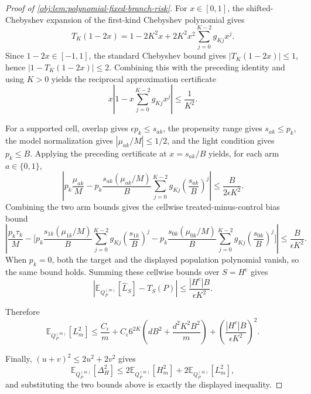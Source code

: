 \begin{proof}[Proof of \cref{obj:lem:polynomial-fixed-branch-risk}]
For \(x\in[0,1]\), the shifted-Chebyshev expansion of the first-kind Chebyshev polynomial gives
\[
T_K(1-2x)
=
1-2K^2x
+2K^2x^2\sum_{j=0}^{K-2}g_{Kj}x^j .
\]
Since \(1-2x\in[-1,1]\), the standard Chebyshev bound gives \(|T_K(1-2x)|\le1\), hence \(|1-T_K(1-2x)|\le2\).  Combining this with the preceding identity and using \(K>0\) yields the reciprocal approximation certificate
\[
x\left|1-x\sum_{j=0}^{K-2}g_{Kj}x^j\right|
\le \frac1{K^2}.
\]

For a supported cell, overlap gives \(\epsilon p_k\le s_{ak}\), the propensity range gives \(s_{ak}\le p_k\), the model normalization gives \(|\mu_{ak}/M|\le1/2\), and the light condition gives \(p_k\le B\). Applying the preceding certificate at \(x=s_{ak}/B\) yields, for each arm \(a\in\{0,1\}\),
\[
\left|
 p_k\frac{\mu_{ak}}{M}
-
 p_k\frac{s_{ak}(\mu_{ak}/M)}{B}
 \sum_{j=0}^{K-2}g_{Kj}\left(\frac{s_{ak}}{B}\right)^j
\right|
\le
\frac{B}{2\epsilon K^2}.
\]
Combining the two arm bounds gives the cellwise treated-minus-control bias bound
\[
\left|
\frac{p_k\tau_k}{M}
-
\Bigg[
 p_k\frac{s_{1k}(\mu_{1k}/M)}{B}
 \sum_{j=0}^{K-2}g_{Kj}\left(\frac{s_{1k}}{B}\right)^j
-
 p_k\frac{s_{0k}(\mu_{0k}/M)}{B}
 \sum_{j=0}^{K-2}g_{Kj}\left(\frac{s_{0k}}{B}\right)^j
\Bigg]
\right|
\le
\frac{B}{\epsilon K^2}.
\]
When \(p_k=0\), both the target and the displayed population polynomial vanish, so the same bound holds. Summing these cellwise bounds over \(S=H^{\mathrm c}\) gives
\[
\left|
\mathbb E_{Q_P^{(m)}}[\widehat L_S]-T_S(P)
\right|
\le
\frac{|H^{\mathrm c}|B}{\epsilon K^2}.
\]

Therefore
\[
\mathbb E_{Q_P^{(m)}}[L_m^2]
\le
\frac{C_\epsilon}{m}
+
C_\epsilon6^{2K}
\left(dB^2+\frac{d^2K^2B^2}{m}\right)
+
\left(\frac{|H^{\mathrm c}|B}{\epsilon K^2}\right)^2 .
\]

Finally, \((u+v)^2\le2u^2+2v^2\) gives
\[
\mathbb E_{Q_P^{(m)}}[\Delta_H^2]
\le
2\mathbb E_{Q_P^{(m)}}[H_m^2]
+
2\mathbb E_{Q_P^{(m)}}[L_m^2],
\]
and substituting the two bounds above is exactly the displayed inequality. %
\end{proof}
